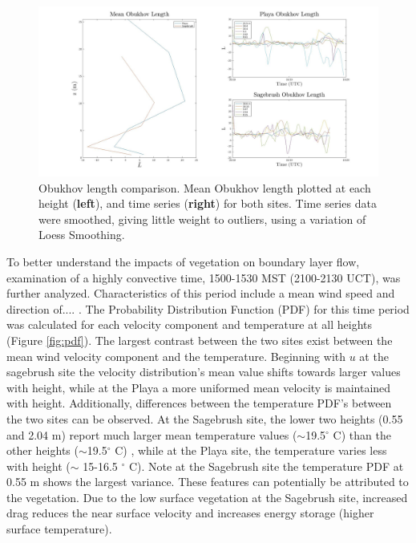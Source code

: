 \documentclass[]{article}
\begin{document}
\begin{figure}
	\centering
	\includegraphics[width=\textwidth]{oblength}
	\caption{Obukhov length comparison. Mean Obukhov length plotted at each height (\textbf{left}), and time series (\textbf{right}) for both sites. Time series data were smoothed, giving little weight to outliers, using a variation of Loess Smoothing.}
	\label{fig:L}
\end{figure}



To better understand the impacts of vegetation on boundary layer flow, examination of a highly convective time, 1500-1530 MST (2100-2130 UCT), was further analyzed. Characteristics of this period include a mean wind speed and direction of.... . 
The Probability Distribution Function (PDF) for this time period was calculated for each velocity component and temperature at all heights (Figure \ref{fig:pdf}). The largest contrast between the two sites exist between the mean wind velocity component and the temperature. Beginning with $u$ at the sagebrush site the velocity distribution's mean value shifts towards larger values with height, while at the Playa a more uniformed mean velocity is maintained with height. Additionally, differences between the temperature PDF's between the two sites can be observed. At the Sagebrush site, the lower two heights (0.55 and 2.04 m) report much larger mean temperature values ($\sim$19.5$^\circ$ C) than the other heights ($\sim$19.5$^\circ$ C) , while at the Playa site, the temperature varies less with height ($\sim$ 15-16.5 $^\circ$ C). Note at the Sagebrush site the temperature PDF at 0.55 m shows the largest variance. These features can potentially be attributed to the vegetation. Due to the low surface vegetation at the Sagebrush site, increased drag reduces the near surface velocity and increases energy storage (higher surface temperature).  
\end{document}
